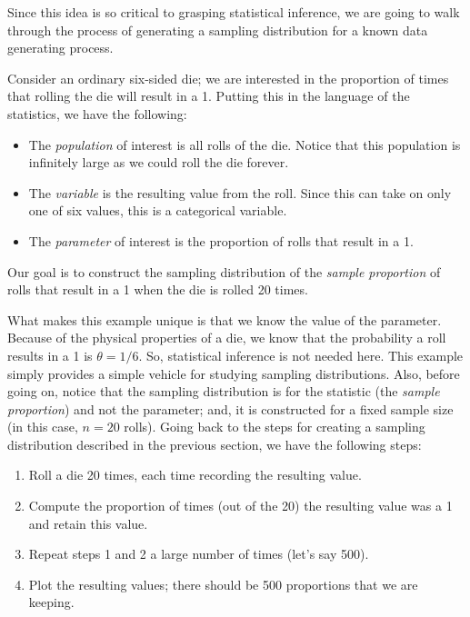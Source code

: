 \documentclass[]{book}
\providecommand{\tightlist}{%
  \setlength{\itemsep}{0pt}\setlength{\parskip}{0pt}}
\theoremstyle{plain}
\theoremstyle{mydefn}
\theoremstyle{myexmpl}
\theoremstyle{remark}
\let\BeginKnitrBlock\begin \let\EndKnitrBlock\end
\let\BeginKnitrBlock\begin \let\EndKnitrBlock\end
\begin{document}
Since this idea is so critical to grasping statistical inference, we are
going to walk through the process of generating a sampling distribution
for a known data generating process.

\BeginKnitrBlock{example}[Dice Experiment]
\protect\hypertarget{exm:samplingdistns-dice}{}{\label{exm:samplingdistns-dice}
{} }Consider an ordinary six-sided die; we
are interested in the proportion of times that rolling the die will
result in a 1. Putting this in the language of the statistics, we have
the following:

\begin{itemize}
\tightlist
\item
  The \emph{population} of interest is all rolls of the die. Notice that
  this population is infinitely large as we could roll the die forever.
\item
  The \emph{variable} is the resulting value from the roll. Since this
  can take on only one of six values, this is a categorical variable.
\item
  The \emph{parameter} of interest is the proportion of rolls that
  result in a 1.
\end{itemize}

Our goal is to construct the sampling distribution of the \emph{sample
proportion} of rolls that result in a 1 when the die is rolled 20 times.
\EndKnitrBlock{example}

What makes this example unique is that we know the value of the
parameter. Because of the physical properties of a die, we know that the
probability a roll results in a 1 is \(\theta = 1/6\). So, statistical
inference is not needed here. This example simply provides a simple
vehicle for studying sampling distributions. Also, before going on,
notice that the sampling distribution is for the statistic (the
\emph{sample proportion}) and not the parameter; and, it is constructed
for a fixed sample size (in this case, \(n = 20\) rolls). Going back to
the steps for creating a sampling distribution described in the previous
section, we have the following steps:

\begin{enumerate}
\def\labelenumi{\arabic{enumi}.}
\tightlist
\item
  Roll a die 20 times, each time recording the resulting value.
\item
  Compute the proportion of times (out of the 20) the resulting value
  was a 1 and retain this value.
\item
  Repeat steps 1 and 2 a large number of times (let's say 500).
\item
  Plot the resulting values; there should be 500 proportions that we are
  keeping.
\end{enumerate}
\end{document}
